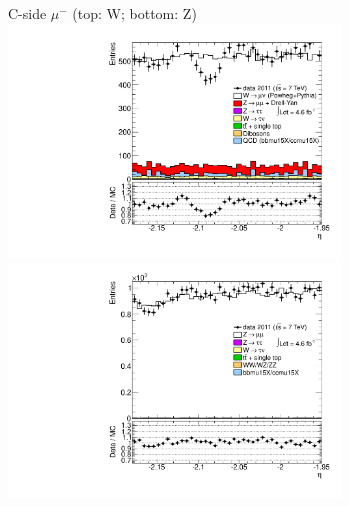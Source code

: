 {{\cole
}


 {
\colb[T]

C-side $\mu^{-}$ (top: W; bottom: Z)
\centering
\includegraphics[width=0.66\textwidth]{dates/20130306/figures/etaphi/WpItoI_10_C_stack_l_eta_NEG} \\
\includegraphics[width=0.66\textwidth]{dates/20130306/figures/etaphi/Z_10_C_stack_lN_eta_ALL.pdf}

}}
